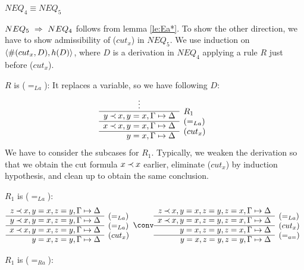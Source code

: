 \begin{LEMMA}\label{le:nocutx}
   $NEQ_4 \equiv NEQ_5$
\end{LEMMA}
\begin{PROOF}
   $NEQ_5\ \mathrel\Rightarrow\ NEQ_4$ follows from lemma
   \ref{le:Ea*}. To show the other direction, we have to show admissibility
   of ($cut_x$) in $NEQ_5$. We use induction on $\langle\#(cut_x,D),h(D)\rangle$, where
   $D$ is a derivation in $NEQ_4$ applying a rule $R$ just before ($cut_x$).
\begin{LS}
\item $R$ is ($=_{La}$): It replaces a variable, so we have following $D$:
\[ \begin{array}{rl}
\multicolumn{1}{c}{\vdots} \\ \cline{1-1}
y\Incl x, y=x, \GSD & \rabove{R_1} \\ \cline{1-1}
x\Incl x, y=x, \GSD & \rabove{(=_{La})} \\ \cline{1-1}
    y=x, \GSD & \rabove{(cut_x)} \end{array} \]
We have to consider the subcases for $R_1$. Typically, we weaken the
derivation so that we obtain the cut formula $x\mathbin{\prec} x$ earlier, eliminate
($cut_x$) by induction hypothesis, and clean up to obtain the same conclusion.
\begin{LSA}
\item\label{ca:eqLa} $R_1$ is ($=_{La}$):
\[ \begin{array}{rl}
z\Incl x, y=x, z=y,\GSD  \\ \cline{1-1}
y\Incl x, y=x, z=y, \GSD & \rabove{(=_{La})} \\ \cline{1-1}
x\Incl x, y=x, z=y, \GSD & \rabove{(=_{La})} \\ \cline{1-1}
          y=x, z=y,\GSD & \rabove{(cut_x)} \end{array} \conv
 \begin{array}{rl}
z\Incl x, y=x, z=y, z=x,\GSD  \\ \cline{1-1}
x\Incl x, y=x, z=y, z=x,\GSD & \rabove{(=_{La})} \\ \cline{1-1}
          y=x, z=y, z=x, \GSD & \rabove{(cut_x)} \\ \cline{1-1}
          y=x, z=y, z=y, \GSD & \rabove{(=_{a=})} \end{array} \]
%
\item $R_1$ is ($=_{Ra}$):
\[ \begin{array}{rl}

\end{array}\]
\end{LSA}
\end{LS}
\end{PROOF}
